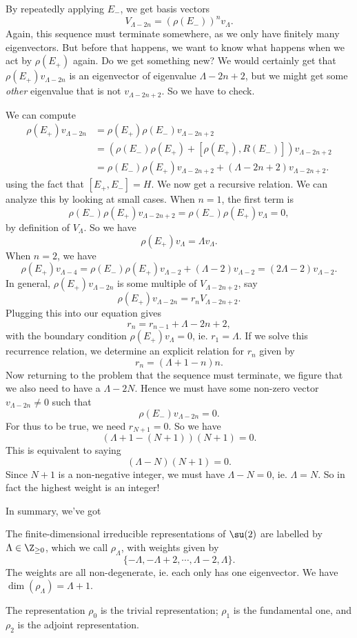 \documentclass[a4paper]{article}
\begin{document}
By repeatedly applying $E_-$, we get basis vectors
\[
  V_{\Lambda - 2n} = (\rho(E_-))^n v_\Lambda.
\]
Again, this sequence must terminate somewhere, as we only have finitely many eigenvectors. But before that happens, we want to know what happens when we act by $\rho(E_+)$ again. Do we get something new? We would certainly get that $\rho(E_+)v_{\Lambda - 2n}$ is an eigenvector of eigenvalue $\Lambda - 2n + 2$, but we might get some \emph{other} eigenvalue that is not $v_{\Lambda - 2n + 2}$. So we have to check.

We can compute
\begin{align*}
  \rho(E_+) v_{\Lambda - 2n} &= \rho(E_+) \rho(E_-) v_{\Lambda - 2n + 2} \\
  &= (\rho(E_-)\rho(E_+) + [\rho(E_+), R(E_-)]) v_{\Lambda - 2n + 2} \\
  &= \rho(E_-) \rho(E_+) v_{\Lambda - 2n + 2} + (\Lambda - 2n + 2)v_{\Lambda - 2n + 2}.
\end{align*}
using the fact that $[E_+, E_-] = H$. We now get a recursive relation. We can analyze this by looking at small cases. When $n = 1$, the first term is
\[
  \rho(E_-)\rho(E_+) v_{\Lambda - 2n + 2} = \rho(E_-) \rho(E_+) v_\Lambda = 0,
\]
by definition of $V_\Lambda$. So we have
\[
  \rho(E_+) v_\Lambda = \Lambda v_\Lambda.
\]
When $n = 2$, we have
\[
  \rho(E_+) v_{\Lambda - 4} = \rho(E_-) \rho(E_+) v_{\Lambda - 2} + (\Lambda - 2) v_{\Lambda - 2} = (2\Lambda - 2) v_{\Lambda - 2}.
\]
In general, $\rho(E_+)v_{\Lambda - 2n}$ is some multiple of $V_{\Lambda - 2n + 2}$, say
\[
  \rho(E_+) v_{\Lambda - 2n} = r_n V_{\Lambda - 2n + 2}.
\]
Plugging this into our equation gives
\[
  r_n = r_{n - 1} + \Lambda - 2n + 2,
\]
with the boundary condition $\rho(E_+)v_\Lambda = 0$, ie. $r_1 = \Lambda$. If we solve this recurrence relation, we determine an explicit relation for $r_n$ given by
\[
  r_n = (\Lambda + 1 - n)n.
\]
Now returning to the problem that the sequence must terminate, we figure that we also need to have a  $\Lambda - 2N$. Hence we must have some non-zero vector $v_{\Lambda - 2n} \not= 0$ such that
\[
  \rho(E_-) v_{\Lambda - 2n} = 0.
\]
For thus to be true, we need $r_{N + 1} = 0$. So we have
\[
  (\Lambda + 1 - (N + 1))(N + 1) = 0.
\]
This is equivalent to saying
\[
  (\Lambda - N)(N + 1) = 0.
\]
Since $N + 1$ is a non-negative integer, we must have $\Lambda - N = 0$, ie. $\Lambda = N$. So in fact the highest weight is an integer!

In summary, we've got
\begin{prop}
  The finite-dimensional irreducible representations of $\su(2)$ are labelled by $\Lambda \in \Z_{\geq 0}$, which we call $\rho_\Lambda$, with weights given by
  \[
    \{-\Lambda, -\Lambda + 2, \cdots, \Lambda - 2, \Lambda\}.
  \]
  The weights are all non-degenerate, ie. each only has one eigenvector. We have $\dim (\rho_\Lambda) = \Lambda + 1$.

  The representation $\rho_0$ is the trivial representation; $\rho_1$ is the fundamental one, and $\rho_2$ is the adjoint representation.
\end{prop}
\end{document}
